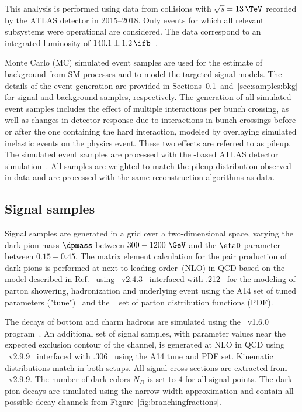 
This analysis is performed using data from \pp collisions with $\sqrt{s}=13\,\TeV$ recorded by the ATLAS detector in 2015--2018. Only events for which all relevant subsystems were operational are considered. The data correspond to an integrated luminosity of $140.1\pm1.2\,\ifb$~\cite{DAPR-2021-01}.

Monte Carlo (MC) simulated event samples are used for the estimate of background from SM processes and to model the targeted signal models. The details of the event generation are provided in Sections~\ref{sec:samples:sig}~and~\ref{sec:samples:bkg} for signal and background samples, respectively.
The generation of all simulated event samples includes the effect of multiple \pp interactions per bunch crossing, as well as changes in detector response due to interactions in bunch crossings before or after the one containing the hard interaction, modeled by overlaying simulated inelastic events on the physics event. These two effects are referred to as pileup. The simulated event samples are processed with the \GEANT-based ATLAS detector simulation~\cite{Agostinelli:2002hh,SOFT-2010-01}. 
All samples are weighted to match the pileup distribution observed in data and are processed with the same reconstruction algorithms as data.

\subsection{Signal samples}
\label{sec:samples:sig}
Signal samples are generated in a grid over a two-dimensional space, varying the dark pion mass $\dpmass$ between $300-1200~\GeV$ and the $\etaD$-parameter between $0.15-0.45$.
The matrix element calculation for the pair production of dark pions is performed at next-to-leading order~(NLO) in QCD based on the model described in Ref.~\cite{Kribs:2018ilo} using \mgamc~v2.4.3~\cite{Alwall:2014hca} interfaced with \pythia.212~\cite{Sjostrand:2014zea} for the modeling of parton showering, hadronization and underlying event using the A14 set of tuned parameters ("tune")~\cite{ATL-PHYS-PUB-2014-021} and the \nnpdftwo~\cite{Ball:2012cx} set of parton distribution functions (PDF).

The decays of bottom and charm hadrons are simulated using the \evtgen\ v1.6.0 program~\cite{Lange:2001uf}.
An additional set of signal samples, with parameter values near the expected exclusion contour of the \allhad channel, is generated at NLO in QCD using \mgamc~v2.9.9~\cite{Alwall:2014hca} interfaced with \pythia.306~\cite{AComGuiToThe} using the A14 tune and \nnpdftwo PDF set. Kinematic distributions match in both setups. All signal cross-sections are extracted from \mgamc~v2.9.9. The number of dark colors $N_D$ is set to $4$ for all signal points. The dark pion decays are simulated using the narrow width approximation and contain all possible decay channels from Figure~\ref{fig:branchingfractions}. 

